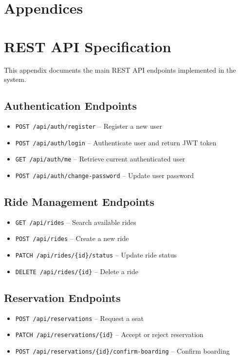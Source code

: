 \appendix
\section*{Appendices}

\section{REST API Specification}

This appendix documents the main REST API endpoints implemented in the system.

\subsection{Authentication Endpoints}

\begin{itemize}
    \item \texttt{POST /api/auth/register} -- Register a new user
    \item \texttt{POST /api/auth/login} -- Authenticate user and return JWT token
    \item \texttt{GET /api/auth/me} -- Retrieve current authenticated user
    \item \texttt{POST /api/auth/change-password} -- Update user password
\end{itemize}

\subsection{Ride Management Endpoints}

\begin{itemize}
    \item \texttt{GET /api/rides} -- Search available rides
    \item \texttt{POST /api/rides} -- Create a new ride
    \item \texttt{PATCH /api/rides/\{id\}/status} -- Update ride status
    \item \texttt{DELETE /api/rides/\{id\}} -- Delete a ride
\end{itemize}

\subsection{Reservation Endpoints}

\begin{itemize}
    \item \texttt{POST /api/reservations} -- Request a seat
    \item \texttt{PATCH /api/reservations/\{id\}} -- Accept or reject reservation
    \item \texttt{POST /api/reservations/\{id\}/confirm-boarding} -- Confirm boarding
\end{itemize}


